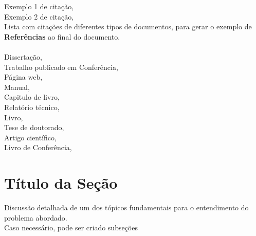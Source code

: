 Exemplo 1 de citação, \cite{almeida2022}\\
Exemplo 2 de citação, \\ 
Lista com citações de  diferentes tipos de documentos, para gerar o exemplo de\\ \textbf{Referências} ao final do documento.\\ \\
Dissertação, \cite{almeida2022}\\
Trabalho publicado em Conferência, \cite{cbsoft2023}\\
Página web, \cite{ferreira2020}\\
Manual, \cite{latex2023}\\
Capitulo de livro, \cite{mendes2019}\\
Relatório técnico, \cite{oliveira2020}\\
Livro, \cite{linden2012}\\
Tese de doutorado, \cite{rodrigues2021}\\
Artigo científico, \cite{silva2023}\\
Livro de Conferência, \cite{souza2022}


\section{Título da Seção} \label{sec:definir-tituto-da-secao}
Discussão detalhada de um dos tópicos fundamentais para o entendimento do problema abordado. \\ Caso necessário, pode ser criado subseções


